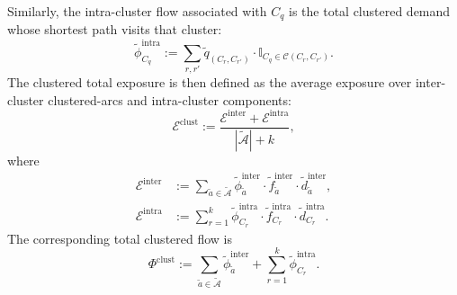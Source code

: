 \documentclass[lettersize,journal]{IEEEtran}
\begin{document}
Similarly, the intra-cluster flow associated with $C_q$ is the total clustered
demand whose shortest path visits that cluster:
\begin{equation}
\label{eq_cluster_flow_intra}
  \tilde{\phi}^{\mathrm{intra}}_{C_q}
  :=
  \sum_{r,r'}
  \tilde{q}_{(C_r,C_{r'})} \cdot
  \mathbb{I}_{C_q\in\mathcal{C}(C_r,C_{r'})}.
\end{equation}
The clustered total exposure is then defined as the average exposure over
inter-cluster clustered-arcs and intra-cluster components:
\begin{equation}
\label{eq_cluster_total_exposure}
  \mathcal{E}^{\mathrm{clust}}
  :=
  \frac{
    \mathcal{E}^{\mathrm{inter}}+\mathcal{E}^{\mathrm{intra}}
  }{
    |\tilde{\mathcal{A}}|+k
  },
\end{equation}
where
\begin{equation}
\label{cluster_def}
\begin{aligned}
  \mathcal{E}^{\mathrm{inter}}
  &:=
  \sum_{\tilde{a}\in\tilde{\mathcal{A}}}
  \tilde{\phi}^{\mathrm{inter}}_{\tilde{a}} \cdot
  \tilde{f}^{\mathrm{inter}}_{\tilde{a}}
  \cdot \tilde{d}^{\mathrm{inter}}_{\tilde{a}}, \\
  \mathcal{E}^{\mathrm{intra}}
  &:=
  \sum_{r=1}^{k}
  \tilde{\phi}^{\mathrm{intra}}_{C_r}
  \cdot
  \tilde{f}^{\mathrm{intra}}_{C_r}
  \cdot
  \tilde{d}^{\mathrm{intra}}_{C_r}.
\end{aligned}
\end{equation}
The corresponding total clustered flow is
\begin{equation}
  \Phi^{\mathrm{clust}}
  :=
  \sum_{\tilde{a}\in\tilde{\mathcal{A}}}
  \tilde{\phi}^{\mathrm{inter}}_{\tilde{a}}
  +
  \sum_{r=1}^{k}
  \tilde{\phi}^{\mathrm{intra}}_{C_r}.
\end{equation}

\end{document}
